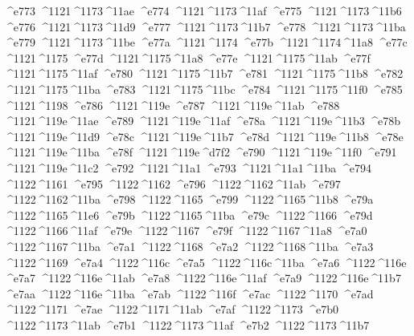 \checkit ^^^^e773 ^^^^1121^^^^1173^^^^11ae
\checkit ^^^^e774 ^^^^1121^^^^1173^^^^11af
\checkit ^^^^e775 ^^^^1121^^^^1173^^^^11b6
\checkit ^^^^e776 ^^^^1121^^^^1173^^^^11d9
\checkit ^^^^e777 ^^^^1121^^^^1173^^^^11b7
\checkit ^^^^e778 ^^^^1121^^^^1173^^^^11ba
\checkit ^^^^e779 ^^^^1121^^^^1173^^^^11be
\checkit ^^^^e77a ^^^^1121^^^^1174
\checkit ^^^^e77b ^^^^1121^^^^1174^^^^11a8
\checkit ^^^^e77c ^^^^1121^^^^1175
\checkit ^^^^e77d ^^^^1121^^^^1175^^^^11a8
\checkit ^^^^e77e ^^^^1121^^^^1175^^^^11ab
\checkit ^^^^e77f ^^^^1121^^^^1175^^^^11af
\checkit ^^^^e780 ^^^^1121^^^^1175^^^^11b7
\checkit ^^^^e781 ^^^^1121^^^^1175^^^^11b8
\checkit ^^^^e782 ^^^^1121^^^^1175^^^^11ba
\checkit ^^^^e783 ^^^^1121^^^^1175^^^^11bc
\checkit ^^^^e784 ^^^^1121^^^^1175^^^^11f0
\checkit ^^^^e785 ^^^^1121^^^^1198
\checkit ^^^^e786 ^^^^1121^^^^119e
\checkit ^^^^e787 ^^^^1121^^^^119e^^^^11ab
\checkit ^^^^e788 ^^^^1121^^^^119e^^^^11ae
\checkit ^^^^e789 ^^^^1121^^^^119e^^^^11af
\checkit ^^^^e78a ^^^^1121^^^^119e^^^^11b3
\checkit ^^^^e78b ^^^^1121^^^^119e^^^^11d9
\checkit ^^^^e78c ^^^^1121^^^^119e^^^^11b7
\checkit ^^^^e78d ^^^^1121^^^^119e^^^^11b8
\checkit ^^^^e78e ^^^^1121^^^^119e^^^^11ba
\checkit ^^^^e78f ^^^^1121^^^^119e^^^^d7f2
\checkit ^^^^e790 ^^^^1121^^^^119e^^^^11f0
\checkit ^^^^e791 ^^^^1121^^^^119e^^^^11c2
\checkit ^^^^e792 ^^^^1121^^^^11a1
\checkit ^^^^e793 ^^^^1121^^^^11a1^^^^11ba
\checkit ^^^^e794 ^^^^1122^^^^1161
\checkit ^^^^e795 ^^^^1122^^^^1162
\checkit ^^^^e796 ^^^^1122^^^^1162^^^^11ab
\checkit ^^^^e797 ^^^^1122^^^^1162^^^^11ba
\checkit ^^^^e798 ^^^^1122^^^^1165
\checkit ^^^^e799 ^^^^1122^^^^1165^^^^11b8
\checkit ^^^^e79a ^^^^1122^^^^1165^^^^11e6
\checkit ^^^^e79b ^^^^1122^^^^1165^^^^11ba
\checkit ^^^^e79c ^^^^1122^^^^1166
\checkit ^^^^e79d ^^^^1122^^^^1166^^^^11af
\checkit ^^^^e79e ^^^^1122^^^^1167
\checkit ^^^^e79f ^^^^1122^^^^1167^^^^11a8
\checkit ^^^^e7a0 ^^^^1122^^^^1167^^^^11ba
\checkit ^^^^e7a1 ^^^^1122^^^^1168
\checkit ^^^^e7a2 ^^^^1122^^^^1168^^^^11ba
\checkit ^^^^e7a3 ^^^^1122^^^^1169
\checkit ^^^^e7a4 ^^^^1122^^^^116c
\checkit ^^^^e7a5 ^^^^1122^^^^116c^^^^11ba
\checkit ^^^^e7a6 ^^^^1122^^^^116e
\checkit ^^^^e7a7 ^^^^1122^^^^116e^^^^11ab
\checkit ^^^^e7a8 ^^^^1122^^^^116e^^^^11af
\checkit ^^^^e7a9 ^^^^1122^^^^116e^^^^11b7
\checkit ^^^^e7aa ^^^^1122^^^^116e^^^^11ba
\checkit ^^^^e7ab ^^^^1122^^^^116f
\checkit ^^^^e7ac ^^^^1122^^^^1170
\checkit ^^^^e7ad ^^^^1122^^^^1171
\checkit ^^^^e7ae ^^^^1122^^^^1171^^^^11ab
\checkit ^^^^e7af ^^^^1122^^^^1173
\checkit ^^^^e7b0 ^^^^1122^^^^1173^^^^11ab
\checkit ^^^^e7b1 ^^^^1122^^^^1173^^^^11af
\checkit ^^^^e7b2 ^^^^1122^^^^1173^^^^11b7
